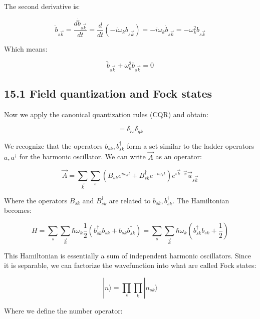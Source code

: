 \documentclass[italian]{HKNdocument}
\begin{document}
The second derivative is:

\begin{equation*}
\ddot{b}_{s\vec{k}}=\frac{d\dot{b}_{s\vec{k}}}{dt}=\frac{d}{dt}(-i\omega_kb_{s\vec{k}})=-i\omega_k\dot{b}_{s\vec{k}}=-\omega_k^2b_{s\vec{k}} \tag{15.16}
\end{equation*}

Which means:

\begin{equation*}
\ddot{b}_{s\vec{k}}+\omega_k^2b_{s\vec{k}}=0 \tag{15.17}
\end{equation*}

\subsection*{15.1 Field quantization and Fock states}
Now we apply the canonical quantization rules (CQR) and obtain:

\begin{equation*}
[b_{sk},b_{rq}^\dagger]=\delta_{rs}\delta_{qk} \tag{15.18}
\end{equation*}

We recognize that the operators $b_{sk}, b_{sk}^\dagger$ form a set similar to the ladder operators $a, a^\dagger$ for the harmonic oscillator. We can write $\vec{A}$ as an operator:

\begin{equation*}
\vec{A}=\sum_{\vec{k}}\sum_s(B_{sk}e^{i\omega_k t}+B_{sk}^\dagger e^{-i\omega_k t})e^{i\vec{k}\cdot\vec{x}}\vec{u}_{s\vec{k}} \tag{15.19}
\end{equation*}

Where the operators $B_{sk}$ and $B_{sk}^\dagger$ are related to $b_{sk}, b_{sk}^\dagger$. The Hamiltonian becomes:

\begin{equation*}
H=\sum_s\sum_{\vec{k}}\hbar\omega_k\frac{1}{2}(b_{sk}^\dagger b_{sk}+b_{sk}b_{sk}^\dagger)=\sum_s\sum_{\vec{k}}\hbar\omega_k(b_{sk}^\dagger b_{sk}+\frac{1}{2}) \tag{15.20}
\end{equation*}


This Hamiltonian is essentially a sum of independent harmonic oscillators. Since it is separable, we can factorize the wavefunction into what are called Fock states:

\begin{equation*}
|n\rangle=\prod_s\prod_k|n_{sk}\rangle \tag{15.21}
\end{equation*}

Where we define the number operator:
\end{document}
